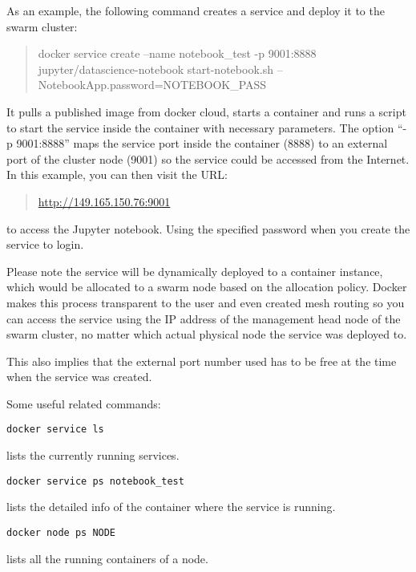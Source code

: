 As an example, the following command creates a service and deploy it to
the swarm cluster:

\begin{quote}
docker service create --name notebook\_test -p 9001:8888
jupyter/datascience-notebook start-notebook.sh
--NotebookApp.password=NOTEBOOK\_PASS
\end{quote}

It pulls a published image from docker cloud, starts a container and
runs a script to start the service inside the container with necessary
parameters. The option ``-p 9001:8888'' maps the service port inside the
container (8888) to an external port of the cluster node (9001) so the
service could be accessed from the Internet. In this example, you can
then visit the URL:

\begin{quote}
\url{http://149.165.150.76:9001}
\end{quote}

to access the Jupyter notebook. Using the specified password when you
create the service to login.

Please note the service will be dynamically deployed to a container
instance, which would be allocated to a swarm node based on the
allocation policy. Docker makes this process transparent to the user and
even created mesh routing so you can access the service using the IP
address of the management head node of the swarm cluster, no matter
which actual physical node the service was deployed to.

This also implies that the external port number used has to be free at
the time when the service was created.

Some useful related commands:


\begin{verbatim}
docker service ls
\end{verbatim}

lists the currently running services.

\begin{verbatim}
docker service ps notebook_test
\end{verbatim}

lists the detailed info of the container where the service is running.

\begin{verbatim}
docker node ps NODE
\end{verbatim}

lists all the running containers of a node.

